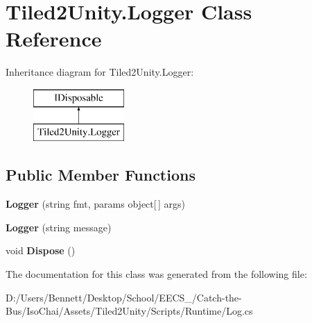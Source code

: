 \hypertarget{class_tiled2_unity_1_1_logger}{}\section{Tiled2\+Unity.\+Logger Class Reference}
\label{class_tiled2_unity_1_1_logger}
Inheritance diagram for Tiled2\+Unity.\+Logger\+:\begin{figure}[H]
\begin{center}
\leavevmode
\includegraphics[height=2.000000cm]{class_tiled2_unity_1_1_logger}
\end{center}
\end{figure}
\subsection*{Public Member Functions}
\begin{DoxyCompactItemize}
\item 
\mbox{\label{class_tiled2_unity_1_1_logger_aecf69e337c743c6e03298b97ef9bfb2d}} 
{\bfseries Logger} (string fmt, params object\mbox{[}$\,$\mbox{]} args)
\item 
\mbox{\label{class_tiled2_unity_1_1_logger_a7531e7cdca3fd985d5c72be4d41d032a}} 
{\bfseries Logger} (string message)
\item 
\mbox{\label{class_tiled2_unity_1_1_logger_ab5aa3518aaaa6bfb065bf5dc6a8a1e7e}} 
void {\bfseries Dispose} ()
\end{DoxyCompactItemize}


The documentation for this class was generated from the following file\+:\begin{DoxyCompactItemize}
\item 
D\+:/\+Users/\+Bennett/\+Desktop/\+School/\+E\+E\+C\+S\+\_/\+Catch-\/the-\/\+Bus/\+Iso\+Chai/\+Assets/\+Tiled2\+Unity/\+Scripts/\+Runtime/Log.\+cs\end{DoxyCompactItemize}

